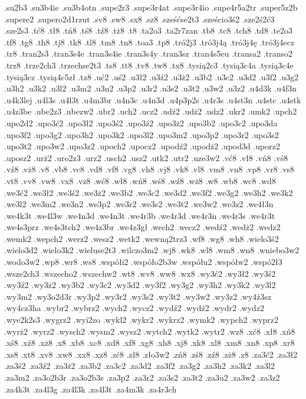 {.su2b3
.su3b4ie
.su3b4otn
.supe2r3
.supe3r4at
.supe3r4io
.supe4r5a2tr
.super5z2b
.supere2
.supero2d1rzut
.sv8
.sw8
.sx8
.sz8
.sześćse2t3
.sześcio3ś2
.sze2ś2ć3
.sze2s3
.tć8
.tł8
.tń8
.tś8
.tź8
.tż8
.t8
.ta2o3
.ta2r7zan
.tb8
.tc8
.tch8
.td8
.te2o3
.tf8
.tg8
.th8
.tj8
.tk8
.tl8
.tm8
.tn8
.toa3
.tp8
.tró2j3
.tró3j4ą
.tró3j4ę
.tró3j4ecz
.tr8
.tran2s3
.tran3s4e
.tran3s4ie
.tran3s4y
.tran3sz
.tran4s5eu
.transa2
.transo2
.trz8
.trze2ch3
.trzechse2t3
.ts8
.tt8
.tv8
.tw8
.tx8
.tysią2c3
.tysią3c4a
.tysią3c4e
.tysią3cz
.tysią4c5zł
.tz8
.uć2
.uś2
.u3ł2
.u3ź2
.u3ż2
.u3b2
.u3c2
.u3d2
.u3f2
.u3g2
.u3h2
.u3k2
.u3l2
.u3m2
.u3n2
.u3p2
.u3r2
.u3s2
.u3t2
.u3w2
.u3z2
.u4d3k
.u4f3n
.u4k3lej
.u4l3s
.u4l3t
.u4m3br
.u4n3c
.u4n3d
.u4p3p2s
.u4r3s
.u4st3n
.u4stc
.u4stk
.u4z3be
.ube2z3
.ubezw2
.ubr2
.uch2
.ucz2
.udź2
.udż2
.udz2
.ukr2
.umk2
.upch2
.upo2d2
.upo3ć2
.upo3ł2
.upo3ś2
.upo3ź2
.upo3ż2
.upo3b2
.upo3c2
.upo3da
.upo3f2
.upo3g2
.upo3h2
.upo3k2
.upo3l2
.upo3m2
.upo3p2
.upo3r2
.upo3s2
.upo3t2
.upo3w2
.upo3z2
.upoch2
.upocz2
.upodź2
.upodż2
.upod3d
.uporz2
.uposz2
.urż2
.uro2z3
.urz2
.usch2
.usz2
.utk2
.utr2
.uze3w2
.vć8
.vł8
.vń8
.vś8
.vź8
.vż8
.v8
.vb8
.vc8
.vd8
.vf8
.vg8
.vh8
.vj8
.vk8
.vl8
.vm8
.vn8
.vp8
.vr8
.vs8
.vt8
.vv8
.vw8
.vx8
.vz8
.wć8
.wł8
.wń8
.wś8
.wź8
.wż8
.w8
.wb8
.wc8
.wd8
.we3ć2
.we3ł2
.we3ś2
.we3ż2
.we3b2
.we3c2
.we3d2
.we3f2
.we3g2
.we3h2
.we3k2
.we3l2
.we3m2
.we3n2
.we3p2
.we3r2
.we3s2
.we3t2
.we3w2
.we3z2
.we4ł3n
.we4k3t
.we4l3w
.we4n3d
.we4n3t
.we4r3b
.we4r3d
.we4r3n
.we4r3s
.we4r3t
.we4s3prz
.we4s3tch2
.we4z3br
.we4z3gł
.wech2
.wecz2
.wedź2
.wedż2
.wedz2
.wemk2
.wepch2
.werz2
.wesz2
.wetk2
.wewną2trz3
.wf8
.wg8
.wh8
.wielo3ś2
.wielo3d2
.wielo3k2
.wieluse2t3
.wilczo3m2
.wj8
.wk8
.wl8
.wm8
.wn8
.wniebo3w2
.wodo3w2
.wp8
.wr8
.ws8
.współi2
.współo2b3w
.współu2
.współw2
.wspó2ł3
.wsze2ch3
.wszecho2
.wszechw2
.wt8
.wv8
.ww8
.wx8
.wy3ć2
.wy3ł2
.wy3ś2
.wy3ź2
.wy3ż2
.wy3b2
.wy3c2
.wy3d2
.wy3f2
.wy3g2
.wy3h2
.wy3k2
.wy3l2
.wy3m2
.wy3o2d3r
.wy3p2
.wy3r2
.wy3s2
.wy3t2
.wy3w2
.wy3z2
.wy4ż3sz
.wy4cz3ha
.wybr2
.wybrz2
.wych2
.wycz2
.wydź2
.wydż2
.wydr2
.wydz2
.wye2k2s3
.wygrz2
.wyi2zo
.wykl2
.wykr2
.wykrz2
.wymk2
.wypch2
.wyprz2
.wyrż2
.wyrz2
.wysch2
.wysm2
.wysz2
.wytch2
.wytk2
.wytr2
.wz8
.xć8
.xł8
.xń8
.xś8
.xź8
.xż8
.x8
.xb8
.xc8
.xd8
.xf8
.xg8
.xh8
.xj8
.xk8
.xl8
.xm8
.xn8
.xp8
.xr8
.xs8
.xt8
.xv8
.xw8
.xx8
.xz8
.zć8
.zł8
.zło3w2
.zń8
.zś8
.zź8
.zż8
.z8
.za3ć2
.za3ł2
.za3ś2
.za3ź2
.za3ż2
.za3b2
.za3c2
.za3d2
.za3f2
.za3g2
.za3h2
.za3k2
.za3l2
.za3m2
.za3o2b3r
.za3o2b3s
.za3p2
.za3r2
.za3s2
.za3t2
.za3u2
.za3w2
.za3z2
.za4k3t
.za4l3g
.za4l3k
.za4l3t
.za4m3k
.za4r3ch
}
